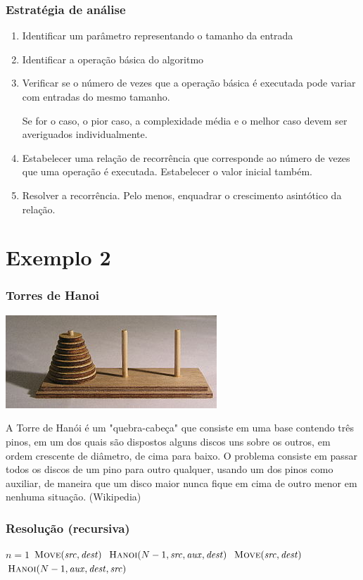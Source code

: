 \documentclass[handout]{beamer}
\begin{document}
\begin{frame}
\frametitle{Estratégia de análise}
\begin{enumerate}
\item Identificar um parâmetro representando o tamanho da entrada
\item Identificar a operação básica do algoritmo
\item Verificar se o número de vezes que a operação básica é executada pode
  variar com entradas do mesmo tamanho.

  Se for o caso, o pior caso, a complexidade média e o melhor caso devem ser
  averiguados individualmente.
\item Estabelecer uma relação de recorrência que corresponde ao número de vezes que uma operação é executada. Estabelecer o valor inicial também.

\item Resolver a recorrência. Pelo menos, enquadrar o crescimento asintótico da
  relação.
\end{enumerate}
\end{frame}

\section{Exemplo 2}
\begin{frame}
\frametitle{Torres de Hanoi}

\includegraphics{../img/hanoi.jpeg}

A Torre de Hanói é um "quebra-cabeça" que consiste em uma base contendo três
pinos, em um dos quais são dispostos alguns discos uns sobre os outros, em ordem
crescente de diâmetro, de cima para baixo. O problema consiste em passar todos
os discos de um pino para outro qualquer, usando um dos pinos como auxiliar, de
maneira que um disco maior nunca fique em cima de outro menor em nenhuma
situação.  (Wikipedia)

\end{frame}

\begin{frame}
\frametitle{Resolução (recursiva)}

\begin{codebox}
\li \If $n = 1$
\li \Then
\li \Return $\proc{Move}(\id{src}, \id{dest})$
\li \Else
\li   $\proc{Hanoi}(N-1, \id{src}, \id{aux}, \id{dest})$
\li   $\proc{Move}(\id{src}, \id{dest})$
\li   $\proc{Hanoi}(N-1, \id{aux}, \id{dest}, \id{src})$
    \End
\end{codebox}
\end{frame}
\end{document}
